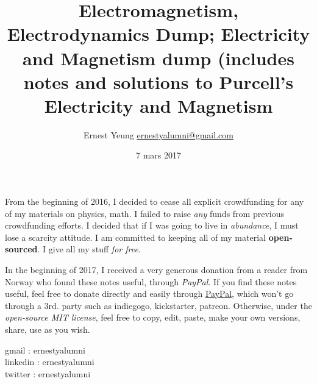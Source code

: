 \documentclass[10pt]{amsart}
\title{Electromagnetism, Electrodynamics Dump;  \large Electricity and Magnetism dump (includes notes and solutions to Purcell's Electricity and Magnetism}
\author{Ernest Yeung \href{mailto:ernestyalumni@gmail.com}{ernestyalumni@gmail.com}}
\date{7 mars 2017}
\begin{document}

\maketitle

From the beginning of 2016, I decided to cease all explicit crowdfunding for any of my materials on physics, math.  I failed to raise \emph{any} funds from previous crowdfunding efforts.  I decided that if I was going to live in \emph{abundance}, I must lose a scarcity attitude.  I am committed to keeping all of my material \textbf{open-sourced}.  I give all my stuff \emph{for free}.   

In the beginning of 2017, I received a very generous donation from a reader from Norway who found these notes useful, through \emph{PayPal}.  If you find these notes useful, feel free to donate directly and easily through \href{https://www.paypal.com/cgi-bin/webscr?cmd=_donations&business=ernestsaveschristmas%2bpaypal%40gmail%2ecom&lc=US&item_name=ernestyalumni&currency_code=USD&bn=PP%2dDonationsBF%3abtn_donateCC_LG%2egif%3aNonHosted}{PayPal}, which won't go through a 3rd. party such as indiegogo, kickstarter, patreon.  Otherwise, under the \emph{open-source MIT license}, feel free to copy, edit, paste, make your own versions, share, use as you wish.    

\noindent gmail        : ernestyalumni \\
linkedin     : ernestyalumni \\
twitter      : ernestyalumni \\


  
\setcounter{tocdepth}{1}
\tableofcontents
\end{document}
